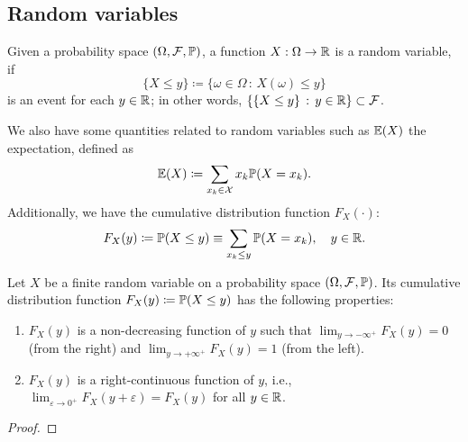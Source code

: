 \documentclass[10pt, a4paper]{article}
\begin{document}
\subsection{Random variables}

\begin{definition}
    Given a probability space $(\Omega, \mathcal{F}, \P)$,
    a function $X : \Omega \to \R$ is a random variable,
    if
    \[
    \{X \leq y\} \coloneqq \{\omega \in \Omega\,:\,X(\omega) \leq y\}
    \]
    is an event for each $y \in \R$;
    in other words,
    $\left\{\{X \leq y\}\,:\, y \in \R\right\} \subset \mathcal{F}$.
\end{definition}

We also have some quantities related to random variables such as $\E(X)$ the expectation,
defined as
\[
\E(X) \coloneqq \sum_{x_k \in \mathcal{X}}x_k\P(X = x_k).
\]
Additionally,
we have the cumulative distribution function $F_X(\cdot)$:
\[
F_X(y) \coloneqq \P(X \leq y) \equiv \sum_{x_k \leq y}\P(X = x_k),\quad y \in \R.
\]

\begin{lemma}
    Let $X$ be a finite random variable on a probability space $(\Omega, \mathcal{F}, \P)$.
    Its cumulative distribution function $F_X(y) \coloneqq \P(X \leq y)$ has the following properties:
    \begin{enumerate}[label = \alph*)]
        \item
        $F_X(y)$ is a non-decreasing function of $y$ such that $\lim_{y \to -\infty ^ {+}}F_X(y) = 0$
        (from the right)
        and $\lim_{y \to +\infty ^ {+}}F_X(y) = 1$
        (from the left).

        \item
        $F_X(y)$ is a right-continuous function of $y$,
        i.e.,
        $\lim_{\varepsilon \to 0 ^ {+}}F_X(y + \varepsilon) = F_X(y)$ for all $y \in \R$.
    \end{enumerate}

    \begin{proof}
        
    \end{proof}
\end{lemma}
\end{document}
